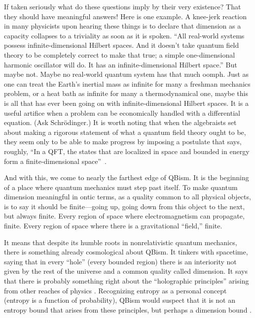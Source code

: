 \documentclass[aps,pra,superscriptaddress,12pt,tightenlines,nofootinbib]{revtex4-2}
\begin{document}
If taken seriously what do these questions imply by their very existence?  That they should have meaningful answers!  Here is one example.  A knee-jerk reaction in many physicists upon hearing these things is to declare that dimension as a capacity collapses to a triviality as soon as it is spoken.  ``All real-world systems possess infinite-dimensional Hilbert spaces.  And it doesn't take quantum field theory to be completely correct to make that true; a simple one-dimensional harmonic oscillator will do.  It has an infinite-dimensional Hilbert space.''  But maybe not.  Maybe no real-world quantum system has that much oomph.  Just as one can treat the Earth's inertial mass as infinite for many a freshman mechanics problem, or a heat bath as infinite for many a thermodynamical one, maybe this is all that has ever been going on with infinite-dimensional Hilbert spaces.  It is a useful artifice when a problem can be economically handled with a differential equation.  (Ask Schr\"odinger.)  It is worth noting that when the algebraists set about making a rigorous statement of what a quantum field theory ought to be, they seem only to be able to make progress by imposing a postulate that says, roughly, ``In a QFT, the states that are localized in space and bounded in energy form a finite-dimensional space''~\cite{Haag10}.

And with this, we come to nearly the farthest edge of QBism.  It is the beginning of a place where quantum mechanics must step past itself.  To make quantum dimension meaningful in ontic terms, as a quality common to all physical objects, is to say it should be finite---going up, going down from this object to the next, but always finite.  Every region of space where electromagnetism can propagate, finite.  Every region of space where there is a gravitational ``field,'' finite.

It means that despite its humble roots in nonrelativistic quantum mechanics, there is something already cosmological about QBism.  It tinkers with spacetime, saying that in every ``hole'' (every bounded region) there is an interiority not given by the rest of the universe and a common quality called dimension.  It says that there is probably something right about the ``holographic principles'' arising from other reaches of physics \cite{Bekenstein2008}.  Recognizing entropy as a personal concept (entropy is a function of probability), QBism would suspect that it is not an entropy bound that arises from these principles, but perhaps a dimension bound \cite{Fuchs04b,Fuchs10b}.
\end{document}
